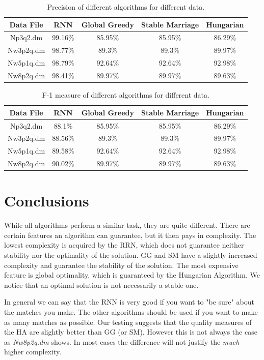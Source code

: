\documentclass[a4paper,11pt]{article}
\begin{document}
\begin{table}[tbh]
\centering
\begin{tabular}{|c|c|c|c|c|}
\hline 
Data File & RNN & Global Greedy & Stable Marriage & Hungarian \tabularnewline
\hline 
\hline 
 Np3q2.dm & 99.16\% & 85.95\% & 85.95\% & 86.29\%\tabularnewline
\hline
 Nw3p2q.dm & 98.77\% & 89.3\% & 89.3\% & 89.97\%\tabularnewline
\hline 
 Nw5p1q.dm & 98.79\% & 92.64\% & 92.64\% & 92.98\%\tabularnewline
\hline 
 Nw8p2q.dm & 98.41\% & 89.97\% & 89.97\% & 89.63\%\tabularnewline
\hline
\end{tabular}
\caption{Precision of different algorithms for different data.}
\label{precision}
\end{table}

\begin{table}[tbh]
\centering
\begin{tabular}{|c|c|c|c|c|}
\hline 
Data File & RNN & Global Greedy & Stable Marriage & Hungarian \tabularnewline
\hline 
\hline 
 Np3q2.dm & 88.1\% & 85.95\% & 85.95\% & 86.29\%\tabularnewline
\hline
 Nw3p2q.dm & 88.56\% & 89.3\% & 89.3\% & 89.97\%\tabularnewline
\hline 
 Nw5p1q.dm & 89.58\% & 92.64\% & 92.64\% & 92.98\%\tabularnewline
\hline 
 Nw8p2q.dm & 90.02\% & 89.97\% & 89.97\% & 89.63\%\tabularnewline
\hline
\end{tabular}
\caption{F-1 measure of different algorithms for different data.}
\label{fmeasure}
\end{table}

\section{Conclusions}

While all algorithms perform a similar task, they are quite different. There are certain features an algorithm can guarantee, but it then pays in complexity. The lowest complexity is acquired by the RRN, which does not guarantee neither stability nor the optimality of the solution. GG and SM have a slightly increased complexity and guarantee the stability of the solution. The most expensive feature is global optimality, which is guaranteed by the Hungarian Algorithm. We notice that an optimal solution is not necessarily a stable one.

In general we can say that the RNN is very good if you want to "be sure" about the matches you make. The other algorithms should be used if you want to make as many matches as possible. Our testing suggests that the quality measures of the HA are slightly better than GG (or SM). However this is not always the case as \textit{Nw8p2q.dm} shows. In most cases the difference will not justify the \textit{much} higher complexity. 
\end{document}
